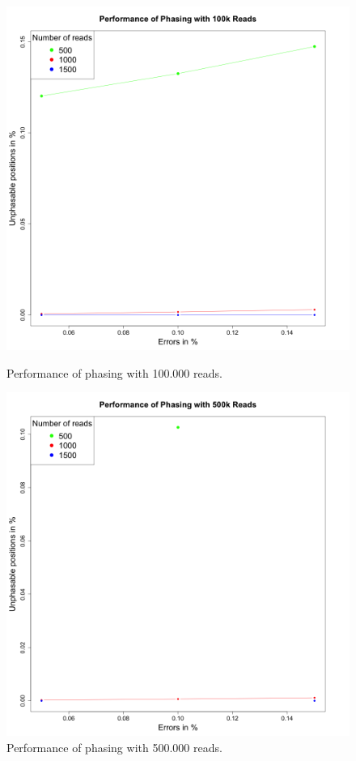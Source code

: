 \documentclass[10pt,a4paper]{article}
\begin{document}
\begin{figure}[!ht]
\centering
\label{fig:unphasable100k}
\includegraphics[height=0.5\textheight]{../output/plots/unphasable100k}
\caption{\footnotesize Performance of phasing with 100.000 reads.}
\label{fig:unphasable500k}
\includegraphics[height=0.5\textheight]{../output/plots/unphasable500k}
\caption{\footnotesize Performance of phasing with 500.000 reads.}
\end{figure}
\end{document}
